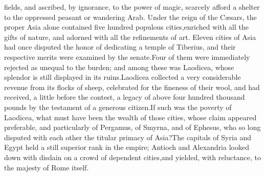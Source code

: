 fields, and ascribed, by ignorance, to the power of magic,
scarcely afford a shelter to the oppressed peasant or wandering
Arab. Under the reign of the Cæsars, the proper Asia alone
contained five hundred populous cities,\footnotemark[79] enriched with all the
gifts of nature, and adorned with all the refinements of art.
Eleven cities of Asia had once disputed the honor of dedicating a
temple of Tiberius, and their respective merits were examined by
the senate.\footnotemark[80] Four of them were immediately rejected as unequal
to the burden; and among these was Laodicea, whose splendor is
still displayed in its ruins.\footnotemark[81] Laodicea collected a very
considerable revenue from its flocks of sheep, celebrated for the
fineness of their wool, and had received, a little before the
contest, a legacy of above four hundred thousand pounds by the
testament of a generous citizen.\footnotemark[82] If such was the poverty of
Laodicea, what must have been the wealth of those cities, whose
claim appeared preferable, and particularly of Pergamus, of
Smyrna, and of Ephesus, who so long disputed with each other the
titular primacy of Asia?\footnotemark[83] The capitals of Syria and Egypt held
a still superior rank in the empire; Antioch and Alexandria
looked down with disdain on a crowd of dependent cities,\footnotemark[84] and
yielded, with reluctance, to the majesty of Rome itself.




